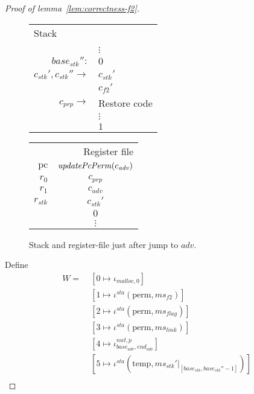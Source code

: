 \documentclass[a4paper]{article}
\newcommand{\var}[1]{\mathit{#1}}
\newcommand{\hs}{\var{ms}}
\newcommand{\ms}{\hs}
\newcommand{\pcreg}{\mathrm{pc}}
\newcommand{\start}{\var{base}}
\newcommand{\addrend}{\var{end}}
\newcommand{\adv}{\var{adv}}
\newcommand{\link}{\var{link}}
\newcommand{\stk}{\var{stk}}
\newcommand{\flag}{\var{flag}}
\newcommand{\nwl}{\var{nwl}}
\newcommand{\sta}{\var{sta}}
\newcommand{\plainfun}[2]{
  \ifthenelse{\equal{#2}{}}
  {\mathit{#1}}
  {\mathit{#1}(#2)}
}
\newcommand{\updatePcPerm}[1]{\plainfun{updatePcPerm}{#1}}
\newcommand{\codelabel}[1]{\mathit{#1}}
\newcommand{\malloc}{\codelabel{malloc}}
\newcommand{\plainview}[1]{\mathrm{#1}}
\newcommand{\perma}{\plainview{perm}}
\newcommand{\temp}{\plainview{temp}}
\begin{document}
\begin{proof}[Proof of lemma~\ref{lem:correctness-f2}]
  \begin{figure}
    \centering
    \begin{tabular}[!h]{r | >{\raggedright\arraybackslash}p{3cm} |}
      \multicolumn{2}{l}{Stack} \\
      \cline{2-2}
   &         \\
   & $\vdots$ \\
      \cline{2-2}
      $\start_\stk'':$   & $0$\\
      \cline{2-2}
      $c_\stk',c_\stk'' \rightarrow$   & $c_\stk'$ \\
      \cline{2-2}
   & $c_{f2}'$ \\
      \cline{2-2}
      $c_{\var{prp}} \rightarrow$   & Restore code \\
   & $\vdots$ \\
      \cline{2-2}
   & $1$\\
      \cline{2-2}
    \end{tabular}
    \hspace{1cm}
    \begin{tabular}{r |c |}
      \multicolumn{2}{r}{Register file} \\
      \cline{2-2}
      $\pcreg$ & $\updatePcPerm{c_\adv}$\\
      \cline{2-2}
      $r_0$  &  $c_{\var{prp}}$ \\
      \cline{2-2}
      $r_1$ & $c_\adv$ \\
      \cline{2-2}
      $r_{\var{stk}}$  & $c_{\var{stk}}'$ \\
      \cline{2-2}
               & $0$ \\
      \cline{2-2}
               & $\vdots$ \\
      \cline{2-2}
    \end{tabular}
    \caption{Stack and register-file just after jump to $\adv$.}
    \label{fig:f2-stack-before-adv}
  \end{figure}
  Define 
  \begin{align*}
    W = \;& [0 \mapsto \iota_{\malloc,0}] \\
          & [1 \mapsto \iota^\sta(\perma,\ms_{f2})]\\ 
          & [2 \mapsto \iota^\sta (\perma,\ms_\flag)]\\
          & [3 \mapsto \iota^\sta (\perma,\ms_\link)]\\
          & [4 \mapsto \iota^{\nwl,p}_{\start_\adv,\addrend_\adv}]\\
          & [5 \mapsto \iota^\sta (\temp,\ms_\stk'|_{[\start_\stk,\start_\stk''-1]})] \\

\end{align*}
\end{proof}
\end{document}

